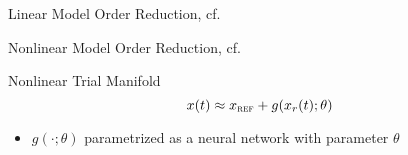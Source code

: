 \begin{frame}{Linear Model Order Reduction, cf.~\cite{Geelen2023}}
\end{frame}

\begin{frame}{Nonlinear Model Order Reduction, cf.~\cite{Lee2020}}
    \begin{block}{Nonlinear Trial Manifold}
        \begin{equation*}
            x(t) \approx x_{\textsc{ref}} + g(x_r(t); \theta)
        \end{equation*}
    \end{block}
    \begin{itemize}
        \item $g(\cdot; \theta)$ parametrized as a neural network with parameter $\theta$
    \end{itemize}

    {
        \begin{columns}
            \begin{column}{.5\textwidth}
            \end{column}
            \begin{column}{.42\textwidth}
            \end{column}
        \end{columns}
    }
\end{frame}

